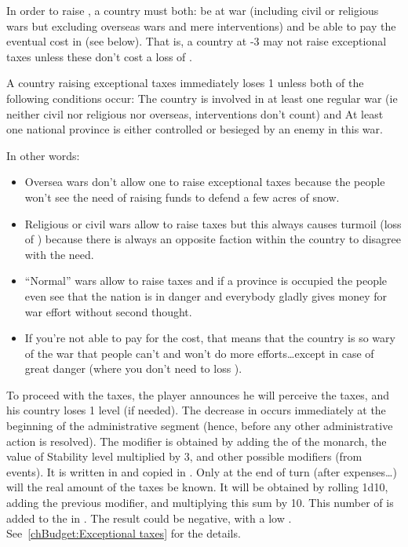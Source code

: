 \aparag[Condition] In order to raise , a country must
both:
\bparag be at war (including civil or religious wars but excluding overseas
wars and mere interventions) and
\bparag be able to pay the eventual cost in \STAB (see below). That is, a
country at -3 \STAB may not raise exceptional taxes unless these don't cost a
loss of \STAB.

 A country raising exceptional taxes immediately loses 1
\STAB unless both of the following conditions occur:
\bparag The country is involved in at least one regular war (ie neither civil
nor religious nor overseas, interventions don't count) and
\bparag At least one national province is either controlled or besieged by an
enemy in this war.

\begin{designnote}
  In other words:
  \begin{itemize}
  \item Oversea wars don't allow one to raise exceptional taxes because the
    people won't see the need of raising funds to defend a few acres of snow.
  \item Religious or civil wars allow to raise taxes but this always causes
    turmoil (loss of \STAB) because there is always an opposite faction within
    the country to disagree with the need.
  \item ``Normal'' wars allow to raise taxes and if a province is occupied the
    people even see that the nation is in danger and everybody gladly gives
    money for war effort without second thought.
  \item If you're not able to pay for the \STAB cost, that means that the
    country is so wary of the war that people can't and won't do more
    efforts\ldots except in case of great danger (where you don't need to loss
    \STAB).
  \end{itemize}
\end{designnote}

\aparag To proceed with the taxes, the player announces he will perceive the
taxes, and his country loses 1 \STAB level (if needed). The decrease in \STAB
occurs immediately at the beginning of the administrative segment (hence,
before any other administrative action is resolved).
\bparag The modifier is obtained by adding the \ADM of the monarch, the value
of Stability level multiplied by 3, and other possible modifiers (from
events). It is written in  and
copied in .
\bparag Only at the end of turn (after expenses\ldots) will the real amount of
the taxes be known. It will be obtained by rolling 1d10, adding the previous
modifier, and multiplying this sum by 10. This number of \Ducats is added to
the \RT in .
\bparag The result could be negative, with a low \STAB.
\bparag See~\ref{chBudget:Exceptional taxes} for the details.

